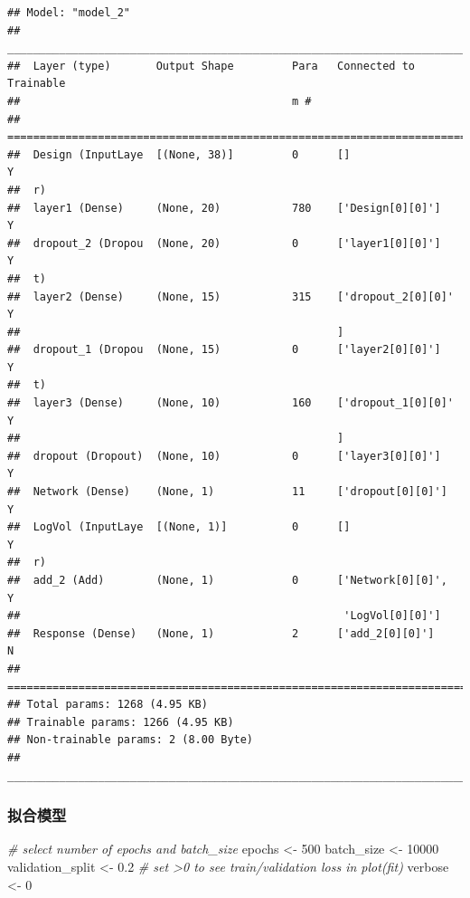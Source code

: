 \documentclass[
]{article}
\newenvironment{Shaded}{\begin{snugshade}}{\end{snugshade}}
\newcommand{\CommentTok}[1]{\textcolor[rgb]{0.56,0.35,0.01}{\textit{#1}}}
\newcommand{\DecValTok}[1]{\textcolor[rgb]{0.00,0.00,0.81}{#1}}
\newcommand{\FloatTok}[1]{\textcolor[rgb]{0.00,0.00,0.81}{#1}}
\newcommand{\NormalTok}[1]{#1}
\newcommand{\OtherTok}[1]{\textcolor[rgb]{0.56,0.35,0.01}{#1}}
\begin{document}
\begin{verbatim}
## Model: "model_2"
## ________________________________________________________________________________
##  Layer (type)       Output Shape         Para   Connected to         Trainable  
##                                          m #                                    
## ================================================================================
##  Design (InputLaye  [(None, 38)]         0      []                   Y          
##  r)                                                                             
##  layer1 (Dense)     (None, 20)           780    ['Design[0][0]']     Y          
##  dropout_2 (Dropou  (None, 20)           0      ['layer1[0][0]']     Y          
##  t)                                                                             
##  layer2 (Dense)     (None, 15)           315    ['dropout_2[0][0]'   Y          
##                                                 ]                               
##  dropout_1 (Dropou  (None, 15)           0      ['layer2[0][0]']     Y          
##  t)                                                                             
##  layer3 (Dense)     (None, 10)           160    ['dropout_1[0][0]'   Y          
##                                                 ]                               
##  dropout (Dropout)  (None, 10)           0      ['layer3[0][0]']     Y          
##  Network (Dense)    (None, 1)            11     ['dropout[0][0]']    Y          
##  LogVol (InputLaye  [(None, 1)]          0      []                   Y          
##  r)                                                                             
##  add_2 (Add)        (None, 1)            0      ['Network[0][0]',    Y          
##                                                  'LogVol[0][0]']                
##  Response (Dense)   (None, 1)            2      ['add_2[0][0]']      N          
## ================================================================================
## Total params: 1268 (4.95 KB)
## Trainable params: 1266 (4.95 KB)
## Non-trainable params: 2 (8.00 Byte)
## ________________________________________________________________________________
\end{verbatim}

\subsubsection{拟合模型}\label{ux62dfux5408ux6a21ux578b-3}

\begin{Shaded}
\begin{Highlighting}[]
\CommentTok{\# select number of epochs and batch\_size}
\NormalTok{epochs }\OtherTok{\textless{}{-}} \DecValTok{500}
\NormalTok{batch\_size }\OtherTok{\textless{}{-}} \DecValTok{10000}
\NormalTok{validation\_split }\OtherTok{\textless{}{-}} \FloatTok{0.2}  \CommentTok{\# set \textgreater{}0 to see train/validation loss in plot(fit)}
\NormalTok{verbose }\OtherTok{\textless{}{-}} \DecValTok{0}
\end{Highlighting}
\end{Shaded}
\end{document}

